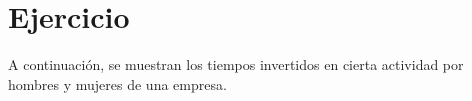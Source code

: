 \documentclass{templateNote}
\begin{document}

\section{Ejercicio}
\indent
A continuación, se muestran los tiempos invertidos en cierta actividad por hombres y mujeres de una empresa.
\end{document}
